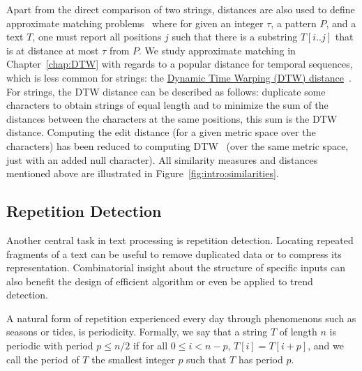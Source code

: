 Apart from the direct comparison of two strings, distances are also used to define approximate matching problems~\cite{landau1986efficient,landau1989fast} where for given an integer $\tau$, a pattern $P$, and a text $T$, one must report all positions $j$ such that there is a substring $T[i..j]$ that is at distance at most $\tau$ from $P$.
We study approximate matching in Chapter~\ref{chap:DTW} with regards to a popular distance for temporal sequences, which is less common for strings: the \underline{Dynamic Time Warping (DTW) distance}~\cite{sakoe1978dynamic}. For strings, the DTW distance can be described as follows: duplicate some characters to obtain strings of equal length and to minimize the sum of the distances between the characters at the same positions, this sum is the DTW distance. Computing the edit distance (for a given metric space over the characters) has been reduced to computing DTW~\cite{DBLP:conf/icalp/Kuszmaul19} (over the same metric space, just with an added null character).
%
All similarity measures and distances mentioned above are illustrated in Figure~\ref{fig:intro:similarities}.





\subsection{Repetition Detection}

Another central task in text processing is repetition detection. Locating repeated fragments of a text can be useful to remove duplicated data or to compress its representation. Combinatorial insight about the structure of specific inputs can also benefit the design of efficient algorithm or even be applied to trend detection.

A natural form of repetition experienced every day through phenomenons such as seasons or tides, is periodicity. Formally, we say that a string $T$ of length $n$ is periodic with period $p \leq n/2$ if for all $0 \leq i < n - p$, $T[i]=T[i+p]$, and we call the period of $T$ the smallest integer $p$ such that $T$ has period $p$.

